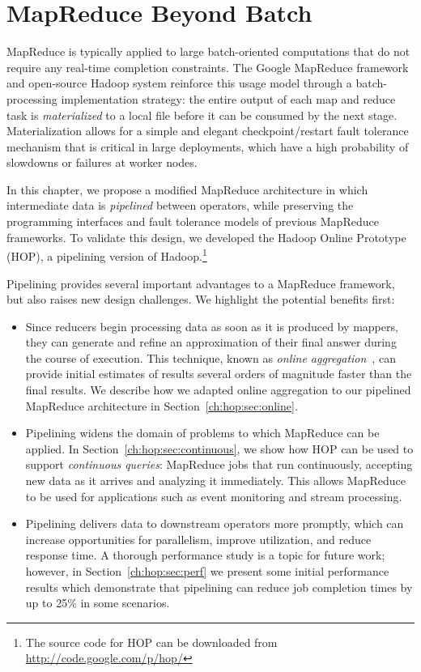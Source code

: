 \chapter[MapReduce Beyond Batch]{MapReduce Beyond Batch}
\label{ch:hop}

MapReduce is typically applied to large batch-oriented computations that do
not require any real-time completion constraints.  The Google MapReduce
framework~\cite{mapreduce-osdi} and open-source Hadoop system reinforce this
usage model through a batch-processing implementation strategy: the entire
output of each map and reduce task is \emph{materialized} to a local file
before it can be consumed by the next stage.  Materialization allows for a
simple and elegant checkpoint/restart fault tolerance mechanism that is critical
in large deployments, which have a high probability of slowdowns or failures at
worker nodes.

In this chapter, we propose a modified MapReduce architecture in which intermediate data is
\emph{pipelined} between operators, while preserving the programming interfaces
and fault tolerance models of previous MapReduce frameworks. To validate this
design, we developed the Hadoop Online Prototype (HOP), a pipelining version of
Hadoop.\footnote{The source code for HOP can be downloaded from \url{http://code.google.com/p/hop/}}

Pipelining provides several important advantages to a MapReduce
framework, but also raises new design challenges. We highlight the
potential benefits first:
\begin{itemize}
\item
  Since reducers begin processing data as soon as it is produced by mappers,
  they can generate and refine an approximation of their final answer during the
  course of execution. This technique, known as \emph{online
    aggregation}~\cite{onlineagg}, can provide initial estimates of results
  several orders of magnitude faster than the final results.  We
  describe how we adapted online aggregation to our pipelined MapReduce
  architecture in Section~\ref{ch:hop:sec:online}.

\item
  Pipelining widens the domain of problems to which MapReduce can be applied. In
  Section~\ref{ch:hop:sec:continuous}, we show how HOP can be used to support
  \emph{continuous queries}: MapReduce jobs that run continuously, accepting new
  data as it arrives and analyzing it immediately. This allows MapReduce to be
  used for applications such as event monitoring and stream processing.

\item
  Pipelining delivers data to downstream operators more promptly, which can
  increase opportunities for parallelism, improve utilization, and reduce
  response time. A thorough performance study is a topic for future work;
  however, in Section~\ref{ch:hop:sec:perf} we present some initial performance
  results which demonstrate that pipelining can reduce job completion times by
  up to 25\% in some scenarios.
\end{itemize}

